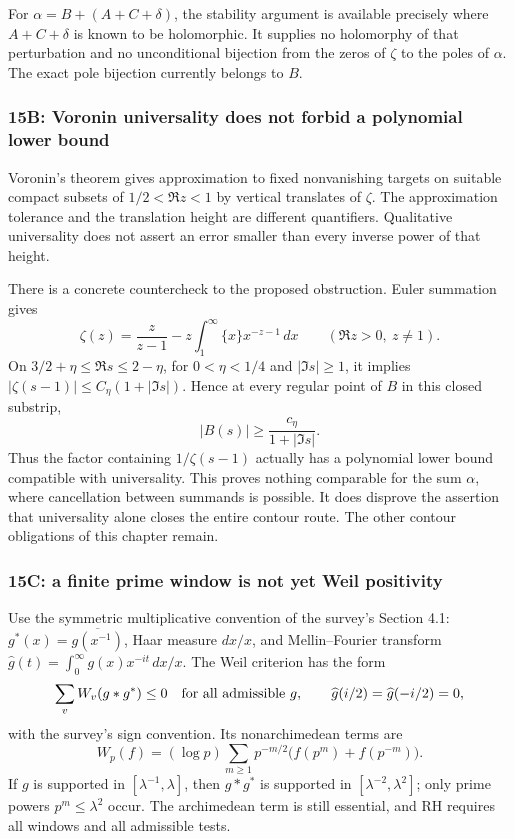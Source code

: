 \documentclass[11pt]{amsart}
\numberwithin{equation}{section}
\theoremstyle{plain}
\theoremstyle{definition}
\theoremstyle{remark}
\begin{document}
For $\alpha=B+(A+C+\delta)$, the stability argument is available precisely
where $A+C+\delta$ is known to be holomorphic.
It supplies no holomorphy of that perturbation and no unconditional
bijection from the zeros of $\zeta$ to the poles of $\alpha$.
The exact pole bijection currently belongs to $B$.

\subsubsection{15B: Voronin universality does not forbid a polynomial lower bound}
\label{subsubsec:a12-universality}
Voronin's theorem gives approximation to fixed nonvanishing targets on
suitable compact subsets of $1/2<\Re z<1$ by vertical translates of
$\zeta$. The approximation tolerance and the translation height are
different quantifiers. Qualitative universality does not assert an
error smaller than every inverse power of that height.

There is a concrete countercheck to the proposed obstruction. Euler
summation gives
\begin{equation}
\label{eq:a12-zeta-elementary}
\zeta(z)=\frac{z}{z-1}
-z\int_1^\infty \{x\}x^{-z-1}\,dx\qquad(\Re z>0,\ z\ne1).
\end{equation}
On $3/2+\eta\le\Re s\le2-\eta$, for $0<\eta<1/4$ and $|\Im s|\ge1$,
it implies $|\zeta(s-1)|\le C_\eta(1+|\Im s|)$. Hence at every regular
point of $B$ in this closed substrip,
\begin{equation}
\label{eq:a12-B-lower}
\boxed{|B(s)|\ge\frac{c_\eta}{1+|\Im s|}.}
\end{equation}
Thus the factor containing $1/\zeta(s-1)$ actually has a polynomial
lower bound compatible with universality. This proves nothing comparable
for the sum $\alpha$, where cancellation between summands is possible.
It does disprove the assertion that universality alone closes the entire
contour route. The other contour obligations of this chapter remain.

\subsubsection{15C: a finite prime window is not yet Weil positivity}
\label{subsubsec:a12-Weil-window}
Use the symmetric multiplicative convention of the survey's Section 4.1:
$g^*(x)=\overline{g(x^{-1})}$, Haar measure $dx/x$, and Mellin--Fourier
transform $\widehat g(t)=\int_0^\infty g(x)x^{-it}\,dx/x$.
The Weil criterion has the form
\begin{equation}
\label{eq:a12-Weil}
\sum_v W_v(g*g^*)\le0
\quad\hbox{for all admissible }g,\qquad
\widehat g(i/2)=\widehat g(-i/2)=0,
\end{equation}
with the survey's sign convention. Its nonarchimedean terms are
\begin{equation}
\label{eq:a12-Weil-primes}
W_p(f)=(\log p)\sum_{m\ge1}p^{-m/2}
\bigl(f(p^m)+f(p^{-m})\bigr).
\end{equation}
If $g$ is supported in $[\lambda^{-1},\lambda]$, then $g*g^*$ is
supported in $[\lambda^{-2},\lambda^2]$; only prime powers
$p^m\le\lambda^2$ occur. The archimedean term is still essential, and
RH requires all windows and all admissible tests.
\end{document}
